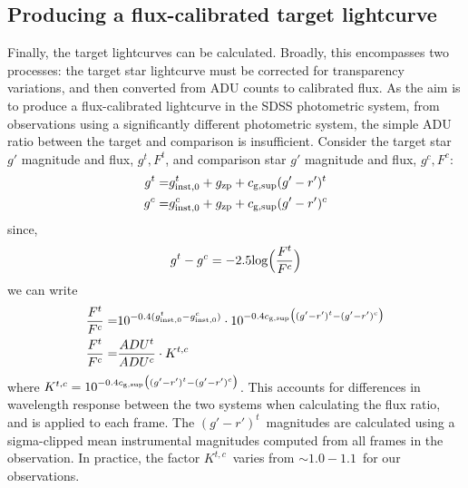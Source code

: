 \subsection{Producing a flux-calibrated target lightcurve}
\label{sect:observations:flux calibrating the lightcurve}

Finally, the target lightcurves can be calculated. Broadly, this encompasses two processes: the target star lightcurve must be corrected for transparency variations, and then converted from ADU counts to calibrated flux.
As the aim is to produce a flux-calibrated lightcurve in the SDSS photometric system, from observations using a significantly different photometric system, the simple ADU ratio between the target and comparison is insufficient.
Consider the target star $g'$ magnitude and flux, $g^t, F^t$, and comparison star $g'$ magnitude and flux, $g^c, F^c$:
\begin{align*}
    g^t =& g^t_{\rm inst,0} + g_{\rm zp} + c_{\rm g, sup}(g'-r')^t \\
    g^c =& g^c_{\rm inst,0} + g_{\rm zp} + c_{\rm g, sup}(g'-r')^c \\
\end{align*}
since,
\begin{equation*}
    g^t - g^c = -2.5{\rm log}\Big(\frac{F^t}{F^c}\Big) \\
\end{equation*}
we can write
\begin{align*}
    \frac{F^t}{F^c} =& 10^{-0.4(g^t_{\rm inst,0} - g^c_{\rm inst,0})} \cdot 10^{-0.4c_{\rm g, sup}\big((g'-r')^t - (g'-r')^c\big)} \\
    \frac{F^t}{F^c} =& \frac{ADU^t}{ADU^c}\cdot K^{t,c} \\
\end{align*}
where $K^{t,c} = 10^{-0.4c_{\rm g, sup}\big((g'-r')^t - (g'-r')^c\big)}$.
This accounts for differences in wavelength response between the two systems when calculating the flux ratio, and is applied to each frame. The $(g'-r')^t$\ magnitudes are calculated using a sigma-clipped mean instrumental magnitudes computed from all frames in the observation. In practice, the factor $K^{t,c}$\ varies from $\sim 1.0 - 1.1$\ for our observations.

